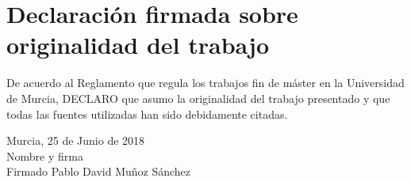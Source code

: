 \chapter*{Declaración firmada sobre originalidad del
  trabajo\label{cap:orginalidad}}

De acuerdo al Reglamento que regula los trabajos fin de máster en la
Universidad de Murcia, DECLARO que asumo la originalidad del trabajo
presentado y que todas las fuentes utilizadas han sido debidamente
citadas.

\vspace{10em}

\begin{raggedleft}
Murcia, 25 de Junio de 2018\\

Nombre y firma\\

Firmado Pablo David Muñoz Sánchez\\

\end{raggedleft}
